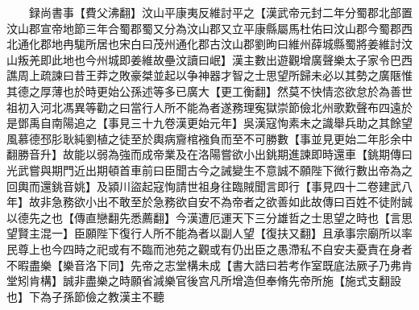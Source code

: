 　　録尚書事【費父沸翻】汶山平康夷反維討平之【漢武帝元封二年分蜀郡北部置汶山郡宣帝地節三年合蜀郡蜀又分為汶山郡又立平康縣屬馬杜佑曰汶山郡今蜀郡西北通化郡地冉駹所居也宋白曰茂州通化郡古汶山郡劉昫曰維州薛城縣蜀將姜維討汶山叛羌即此地也今州城即姜維故壘汶讀曰岷】漢主數出遊觀增廣聲樂太子家令巴西譙周上疏諫曰昔王莽之敗豪桀並起以争神器才智之士思望所歸未必以其勢之廣陿惟其德之厚薄也於時更始公孫述等多已廣大【更工衡翻】然莫不快情恣欲怠於為善世祖初入河北馮異等勸之曰當行人所不能為者遂務理寃獄崇節儉北州歌歎聲布四遠於是鄧禹自南陽追之【事見三十九卷漢更始元年】吳漢寇恂素未之識舉兵助之其餘望風慕德邳肜耿純劉植之徒至於輿病齎棺襁負而至不可勝數【事並見更始二年肜余中翻勝音升】故能以弱為強而成帝業及在洛陽嘗欲小出銚期進諫即時還車【銚期傳曰光武嘗與期門近出期頓首車前曰臣聞古今之誡變生不意誠不願陛下微行數出帝為之回輿而還銚音姚】及潁川盜起寇恂請世祖身往臨賊聞言即行【事見四十二卷建武八年】故非急務欲小出不敢至於急務欲自安不為帝者之欲善如此故傳曰百姓不徒附誠以德先之也【傳直戀翻先悉薦翻】今漢遭厄運天下三分雄哲之士思望之時也【言思望賢主混一】臣願陛下復行人所不能為者以副人望【復扶又翻】且承事宗廟所以率民尊上也今四時之祀或有不臨而池苑之觀或有仍出臣之愚滯私不自安夫憂責在身者不暇盡樂【樂音洛下同】先帝之志堂構未成【書大誥曰若考作室既底法厥子乃弗肯堂矧肯構】誠非盡樂之時願省減樂官後宫凡所增造但奉脩先帝所施【施式支翻設也】下為子孫節儉之教漢主不聽

